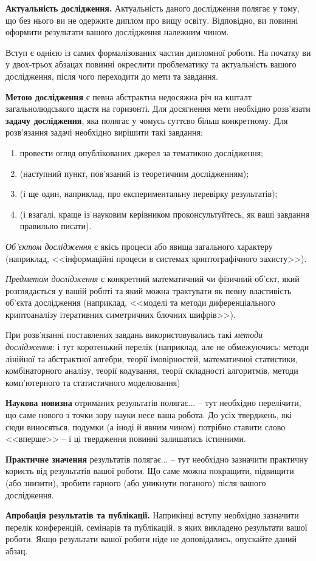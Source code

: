 \textbf{Актуальність дослідження.} Актуальність даного дослідження полягає 
у тому, що без нього ви не одержите диплом про вищу освіту. Відповідно, ви повинні 
оформити результати вашого дослідження належним чином.

Вступ є однією із самих формалізованих частин дипломної роботи. На початку 
ви у двох-трьох абзацах повинні окреслити проблематику та актуальність 
вашого дослідження, після чого переходити до мети та завдання.

\textbf{Метою дослідження} є певна абстрактна недосяжна річ на кшталт 
загальнолюдського щастя на горизонті. Для досягнення мети необхідно 
розв'язати \textbf{задачу дослідження}, яка полягає у чомусь суттєво більш 
конкретному. Для розв'язання задачі необхідно вирішити такі завдання:

\begin{enumerate}
\item провести огляд опублікованих джерел за тематикою дослідження;
\item (наступний пункт, пов'язаний із теоретичним дослідженням);
\item (і ще один, наприклад, про експериментальну перевірку результатів);
\item (і взагалі, краще із науковим керівником проконсультуйтесь, як ваші 
завдання правильно писати).
\end{enumerate}

\emph{Об'єктом дослідження} є якісь процеси або явища загального 
характеру (наприклад, <<інформаційні процеси в системах криптографічного 
захисту>>).

\emph{Предметом дослідження} є конкретний математичний чи фізичний 
об'єкт, який розглядається у вашій роботі та який можна трактувати
як певну властивість об'єкта дослідження (наприклад, <<моделі та методи
диференціального криптоаналізу ітеративних симетричних блочних шифрів>>).

При розв’язанні поставлених завдань використовувались такі \emph{методи дослідження}: і 
тут коротенький перелік (наприклад, але не обмежуючись: методи лінійної та абстрактної 
алгебри, теорії імовірностей, математичної статистики, комбінаторного 
аналізу, теорії кодування, теорії складності алгоритмів, методи 
комп’ютерного та статистичного моделювання) 

\textbf{Наукова новизна} отриманих результатів полягає... -- тут необхідно 
перелічити, що саме нового з точки зору науки несе ваша робота. До усіх 
тверджень, які сюди виносяться, подумки (а іноді й явним чином) потрібно 
ставити слово <<вперше>> -- і ці твердження повинні залишатись істинними.

\textbf{Практичне значення} результатів полягає... -- тут необхідно 
зазначити практичну користь від результатів вашої роботи. Що саме можна 
покращити, підвищити (або знизити), зробити гарного (або уникнути 
поганого) після вашого дослідження.

\textbf{Апробація результатів та публікації.} Наприкінці вступу необхідно 
зазначити перелік конференцій, семінарів та публікацій, в яких викладено 
результати вашої роботи. Якщо результати вашої роботи ніде не 
доповідались, опускайте даний абзац.